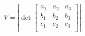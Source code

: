 \documentclass[12pt]{article}
\begin{document}
\[
    V = \left| \det \begin{bmatrix}
        a_1 & a_2 & a_3 \\
        b_1 & b_2 & b_3 \\
        c_1 & c_2 & c_3 \\
    \end{bmatrix} \right|
\]
\end{document}
